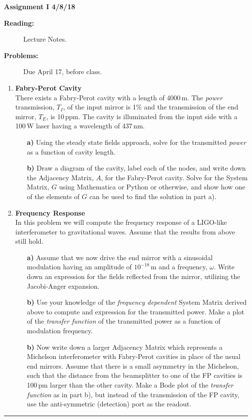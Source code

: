 \documentclass[11pt]{article}
\begin{document}
%
\centerline{\large\bf  \hfill Assignment I \hfill  4/8/18}

\medskip
\begin{description}
\item[{\bf Reading:}] Lecture Notes. \\
\item[{\bf Problems:} \hfill ] Due April 17, before class.
\end{description}


\medskip

\begin{enumerate}

\item
{\bf Fabry-Perot Cavity} \\
There exists a Fabry-Perot cavity with a length of 4000\,m. The \emph{power} transmission, $T_I$, of the input mirror is 1\% and the transmission of the end mirror, $T_E$, is 10\,ppm. The cavity is illuminated from the input side with a 100\,W laser having a wavelength of 437\,nm.
\begin{itemize}
\item[\bf a)] Using the steady state fields approach, solve for the transmitted \emph{power} as a function of cavity length.
\item[\bf b)] Draw a diagram of the cavity, label each of the nodes, and write down the Adjacency Matrix, $A$, for the Fabry-Perot cavity. Solve for the System Matrix, $G$ using Mathematica or Python or otherwise, and show how one of the elements of $G$ can be used to find the solution in part a).
\end{itemize}

\item
{\bf Frequency Response} \\
In this problem we will compute the frequency response of a LIGO-like interferometer to gravitational waves. Assume that the results from above still hold.
\begin{itemize}
\item[\bf a)] Assume that we now drive the end mirror with a sinusoidal modulation having an amplitude of $10^{-18}$\,m and a frequency, $\omega$. Write down an expression for the fields reflected from the mirror, utilizing the Jacobi-Anger expansion.
\item[\bf b)] Use your knowledge of the \emph{frequency dependent} System Matrix derived above to compute and expression for the transmitted power. Make a plot of the \emph{transfer function} of the transmitted power as a function of modulation frequency.
\item[\bf b)] Now write down a larger Adjacency Matrix which represents a Michelson interferometer with Fabry-Perot cavities in place of the usual end mirrors. Assume that there is a small asymmetry in the Michelson, such that the distance from the beamsplitter to one of the FP cavities is 100\,pm larger than the other cavity.
Make a Bode plot of the \emph{transfer function} as in part b), but instead of the transmission of the FP cavity, use the anti-symmetric (detection) port as the readout.
\end{itemize}

\end{enumerate}

\bigskip
{\color{Sepia} \hrule}
\end{document}
